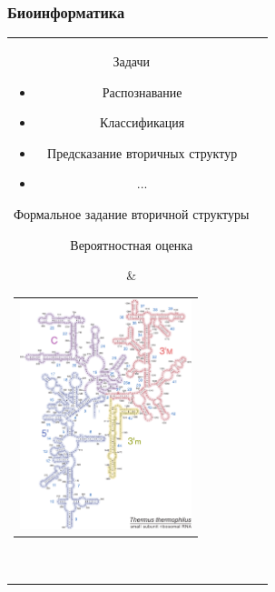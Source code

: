 \documentclass{beamer}
\begin{document}
\begin{frame} \frametitle{Биоинформатика}
\begin{tabular}{cl}  
    \parbox{0.44\linewidth}{
        \begin{itemize}
            \item Задачи
            \begin{itemize}
                \item Распознавание
                \item Классификация
                \item Предсказание вторичных структур
                \item ...
            \end{itemize}
   {\item Формальное задание вторичной структуры}
    {\item Вероятностная оценка}
        \end{itemize}
    }
    & \begin{tabular}{l}
        \vspace{-0.8cm}
        \hspace{-0.8cm}
        \includegraphics[width=5.0cm]{pics/16s.pdf}
    \end{tabular}  \\
\end{tabular}
\end{frame}
\end{document}
